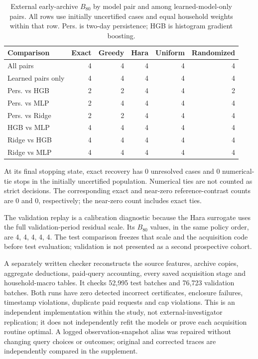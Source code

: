 \documentclass[12pt]{article}
\begin{document}
\begin{table}[htbp]
\centering\small
\caption{External early-archive $B_{80}$ by model pair and among learned-model-only pairs. All rows use initially uncertified cases and equal household weights within that row. Pers. is two-day persistence; HGB is histogram gradient boosting.}
\label{tab:external-pairs}
\begin{tabular}{lrrrrr}
\toprule
Comparison & Exact & Greedy & Hara & Uniform & Randomized\\
\midrule
All pairs & 4 & 4 & 4 & 4 & 4\\
Learned pairs only & 4 & 4 & 4 & 4 & 4\\\midrule
Pers. vs HGB & 2 & 2 & 4 & 4 & 2\\
Pers. vs MLP & 2 & 4 & 4 & 4 & 4\\
Pers. vs Ridge & 2 & 2 & 4 & 4 & 4\\
HGB vs MLP & 4 & 4 & 4 & 4 & 4\\
Ridge vs HGB & 4 & 4 & 4 & 4 & 4\\
Ridge vs MLP & 4 & 4 & 4 & 4 & 4\\
\bottomrule
\end{tabular}
\end{table}

At its final stopping state, exact recovery has 0 unresolved cases and 0 numerical-tie stops in the initially uncertified population. Numerical ties are not counted as strict decisions. The corresponding exact and near-zero reference-contrast counts are 0 and 0, respectively; the near-zero count includes exact ties.

The validation replay is a calibration diagnostic because the Hara surrogate uses the full validation-period residual scale. Its $B_{80}$ values, in the same policy order, are 4, 4, 4, 4, 4. The test comparison freezes that scale and the acquisition code before test evaluation; validation is not presented as a second prospective cohort.

A separately written checker reconstructs the source features, archive copies, aggregate deductions, paid-query accounting, every saved acquisition stage and household-macro tables. It checks 52,995 test batches and 76,723 validation batches. Both runs have zero detected incorrect certificates, enclosure failures, timestamp violations, duplicate paid requests and cap violations. This is an independent implementation within the study, not external-investigator replication; it does not independently refit the models or prove each acquisition routine optimal. A logged observation-snapshot alias was repaired without changing query choices or outcomes; original and corrected traces are independently compared in the supplement.
\end{document}
